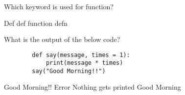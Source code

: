 \documentclass{exam}
\begin{document}
\begin{questions}

    \question Which keyword is used for function?

    \begin{oneparchoices}
        \choice Def
        \choice def
        \choice function
        \choice defn
    \end{oneparchoices}

    \question What is the output of the below code?

    \begin{verbatim}
        def say(message, times = 1):
            print(message * times)
        say("Good Morning!!")
    \end{verbatim}

    \begin{oneparchoices}
        \choice Good Morning!!
        \choice Error
        \choice Nothing gets printed
        \choice Good Morning
    \end{oneparchoices}
\end{questions}
\end{document}
